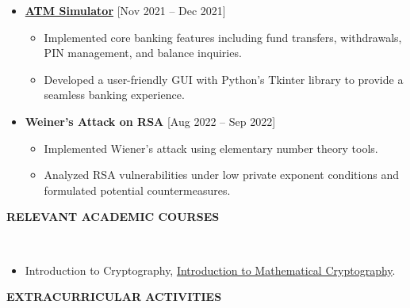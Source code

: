 \documentclass[10pt,article]{article}
\newcommand{\resheading}[1]{%
  {\small \colorbox{mygrey}{%
  \begin{minipage}{0.99\textwidth}\centering \textbf{#1 \vphantom{p\^{E}}}\end{minipage}}}}
\begin{document}
\begin{itemize}
\setlength\itemsep{0.5em}

\item \textbf{\href{https://github.com/aliztty/Atmp}{ATM Simulator}} \hfill {[Nov 2021 – Dec 2021]}
	\begin{itemize}[noitemsep,nolistsep]
	\setlength{\itemsep}{0.2cm}
	\item Implemented core banking features including fund transfers, withdrawals, PIN management, and balance inquiries.
	\item Developed a user-friendly GUI with Python's Tkinter library to provide a seamless banking experience.
	\end{itemize}

\item \textbf{Weiner’s Attack on RSA} \hfill {[Aug 2022 – Sep 2022]}
	\begin{itemize}[noitemsep,nolistsep]
	\setlength{\itemsep}{0.2cm}
	\item Implemented Wiener's attack using elementary number theory tools.
	\item Analyzed RSA vulnerabilities under low private exponent conditions and formulated potential countermeasures.
	\end{itemize}

\end{itemize}

\noindent
\resheading{RELEVANT ACADEMIC COURSES}\\[0.1pt]
\begin{itemize}[noitemsep,nolistsep]
	\item Introduction to Cryptography, \href{https://github.com/aliztty/Mcrypto?tab=readme-ov-file}{Introduction to Mathematical Cryptography}.\\[0.1pt]
\end{itemize}

\noindent
\resheading{EXTRACURRICULAR ACTIVITIES}\\[-0.45cm]
\end{document}
